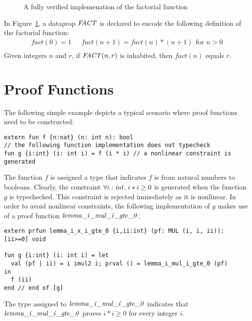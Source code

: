 \begin{figure}

\caption{A fully verified implemenation of the factorial function}
\label{figure:factorial_function_proof}
\end{figure}
In Figure~\ref{figure:factorial_function_proof}, a dataprop
${\it FACT}$ is declared to encode the following definition of the factorial
function:
\[\begin{array}{ll}
fact (0) = 1 ~~~& fact (n+1) = fact (n) * (n+1)~~\mbox{for $n>0$} \\
\end{array}\]
Given integers $n$ and $r$, if ${\it FACT}(n,r)$ is inhabited, then
$fact(n)$ equals $r$.

\section{Proof Functions}
The following simple example depicts a typical scenario where
proof functions need to be constructed:
\begin{verbatim}
extern fun f {n:nat} (n: int n): bool
// the following function implementation does not typecheck
fun g {i:int} (i: int i) = f (i * i) // a nonlinear constraint is generated
\end{verbatim}
The function $f$ is assigned a type that indicates $f$ is from natural
numbers to booleans. Clearly, the constraint $\forall{i:{\it int}}.~i*i\geq 0$
is generated when the function $g$ is typechecked. This constraint is
rejected immediately as it is nonlinear. In order to avoid nonlinear
constraints, the following implementation of $g$ makes use of a proof
function ${\it lemma\_i\_mul\_i\_gte\_0}$:
\begin{verbatim}
extern prfun lemma_i_x_i_gte_0 {i,ii:int} (pf: MUL (i, i, ii)): [ii>=0] void

fun g {i:int} (i: int i) = let
  val (pf | ii) = i imul2 i; prval () = lemma_i_mul_i_gte_0 (pf)
in
  f (ii)
end // end of [g]
\end{verbatim}
The type assigned to ${\it lemma\_i\_mul\_i\_gte\_0}$ indicates that ${\it
lemma\_i\_mul\_i\_gte\_0}$ proves $i*i\geq 0$ for every integer $i$.

